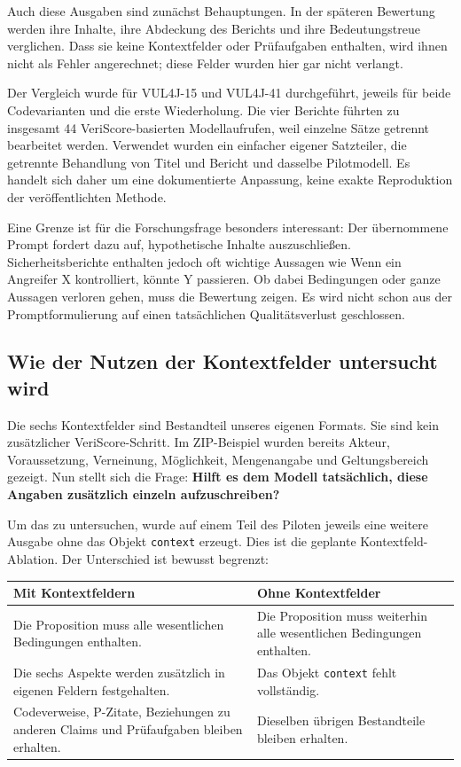 \documentclass[10pt,a4paper]{article}
\begin{document}
Auch diese Ausgaben sind zunächst Behauptungen. In der späteren Bewertung werden ihre Inhalte, ihre Abdeckung des Berichts und ihre Bedeutungstreue verglichen. Dass sie keine Kontextfelder oder Prüfaufgaben enthalten, wird ihnen nicht als Fehler angerechnet; diese Felder wurden hier gar nicht verlangt.

Der Vergleich wurde für VUL4J-15 und VUL4J-41 durchgeführt, jeweils für beide Codevarianten und die erste Wiederholung. Die vier Berichte führten zu insgesamt 44 VeriScore-basierten Modellaufrufen, weil einzelne Sätze getrennt bearbeitet werden. Verwendet wurden ein einfacher eigener Satzteiler, die getrennte Behandlung von Titel und Bericht und dasselbe Pilotmodell. Es handelt sich daher um eine dokumentierte Anpassung, keine exakte Reproduktion der veröffentlichten Methode.

Eine Grenze ist für die Forschungsfrage besonders interessant: Der übernommene Prompt fordert dazu auf, hypothetische Inhalte auszuschlie\ss{}en. Sicherheitsberichte enthalten jedoch oft wichtige Aussagen wie \glqq{}Wenn ein Angreifer X kontrolliert, könnte Y passieren\grqq{}. Ob dabei Bedingungen oder ganze Aussagen verloren gehen, muss die Bewertung zeigen. Es wird nicht schon aus der Promptformulierung auf einen tatsächlichen Qualitätsverlust geschlossen.

\newpage
\subsection{Wie der Nutzen der Kontextfelder untersucht wird}
Die sechs Kontextfelder sind Bestandteil unseres eigenen Formats. Sie sind kein zusätzlicher VeriScore-Schritt. Im ZIP-Beispiel wurden bereits Akteur, Voraussetzung, Verneinung, Möglichkeit, Mengenangabe und Geltungsbereich gezeigt. Nun stellt sich die Frage: \textbf{Hilft es dem Modell tatsächlich, diese Angaben zusätzlich einzeln aufzuschreiben?}

Um das zu untersuchen, wurde auf einem Teil des Piloten jeweils eine weitere Ausgabe ohne das Objekt \texttt{context} erzeugt. Dies ist die geplante Kontextfeld-Ablation. Der Unterschied ist bewusst begrenzt:

\begin{tabularx}{\linewidth}{@{}YY@{}}
\toprule
\textbf{Mit Kontextfeldern} & \textbf{Ohne Kontextfelder} \\ \midrule
Die Proposition muss alle wesentlichen Bedingungen enthalten. & Die Proposition muss weiterhin alle wesentlichen Bedingungen enthalten. \\
Die sechs Aspekte werden zusätzlich in eigenen Feldern festgehalten. & Das Objekt \texttt{context} fehlt vollständig. \\
Codeverweise, P-Zitate, Beziehungen zu anderen Claims und Prüfaufgaben bleiben erhalten. & Dieselben übrigen Bestandteile bleiben erhalten. \\
\bottomrule
\end{tabularx}
\end{document}
